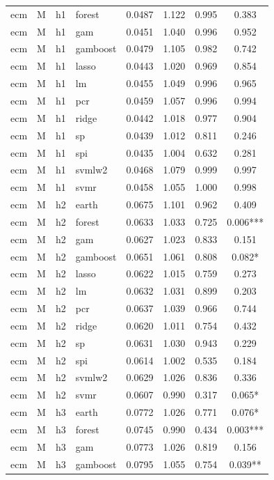 \begin{ThreePartTable}
\begin{longtable}[t]{llclcccc}
ecm & M & h1 & forest & 0.0487 & 1.122 & 0.995 & 0.383\\
ecm & M & h1 & gam & 0.0451 & 1.040 & 0.996 & 0.952\\
ecm & M & h1 & gamboost & 0.0479 & 1.105 & 0.982 & 0.742\\
ecm & M & h1 & lasso & 0.0443 & 1.020 & 0.969 & 0.854\\
ecm & M & h1 & lm & 0.0455 & 1.049 & 0.996 & 0.965\\
ecm & M & h1 & pcr & 0.0459 & 1.057 & 0.996 & 0.994\\
ecm & M & h1 & ridge & 0.0442 & 1.018 & 0.977 & 0.904\\
ecm & M & h1 & sp & 0.0439 & 1.012 & 0.811 & 0.246\\
ecm & M & h1 & spi & 0.0435 & 1.004 & 0.632 & 0.281\\
ecm & M & h1 & svmlw2 & 0.0468 & 1.079 & 0.999 & 0.997\\
ecm & M & h1 & svmr & 0.0458 & 1.055 & 1.000 & 0.998\\
\addlinespace
ecm & M & h2 & earth & 0.0675 & 1.101 & 0.962 & 0.409\\
ecm & M & h2 & forest & 0.0633 & 1.033 & 0.725 & 0.006***\\
ecm & M & h2 & gam & 0.0627 & 1.023 & 0.833 & 0.151\\
ecm & M & h2 & gamboost & 0.0651 & 1.061 & 0.808 & 0.082*\\
ecm & M & h2 & lasso & 0.0622 & 1.015 & 0.759 & 0.273\\
ecm & M & h2 & lm & 0.0632 & 1.031 & 0.899 & 0.203\\
ecm & M & h2 & pcr & 0.0637 & 1.039 & 0.966 & 0.744\\
ecm & M & h2 & ridge & 0.0620 & 1.011 & 0.754 & 0.432\\
ecm & M & h2 & sp & 0.0631 & 1.030 & 0.943 & 0.229\\
ecm & M & h2 & spi & 0.0614 & 1.002 & 0.535 & 0.184\\
ecm & M & h2 & svmlw2 & 0.0629 & 1.026 & 0.836 & 0.336\\
ecm & M & h2 & svmr & 0.0607 & 0.990 & 0.317 & 0.065*\\
\addlinespace
ecm & M & h3 & earth & 0.0772 & 1.026 & 0.771 & 0.076*\\
ecm & M & h3 & forest & 0.0745 & 0.990 & 0.434 & 0.003***\\
ecm & M & h3 & gam & 0.0773 & 1.026 & 0.819 & 0.156\\
ecm & M & h3 & gamboost & 0.0795 & 1.055 & 0.754 & 0.039**\\

\end{longtable}
\end{ThreePartTable}
